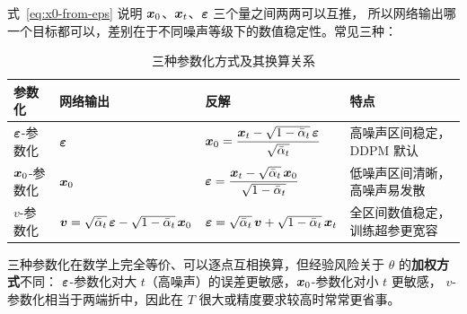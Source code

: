 式~\eqref{eq:x0-from-eps} 说明 $\bm{x}_0$、$\bm{x}_t$、$\bm{\varepsilon}$ 三个量之间两两可以互推，
所以网络输出哪一个目标都可以，差别在于不同噪声等级下的数值稳定性。常见三种：

\begin{table}[htbp]
  \centering
  \caption{三种参数化方式及其换算关系}
  \label{tab:param}
  \small
  \renewcommand{\arraystretch}{1.55}
  \setlength{\tabcolsep}{4pt}
  \begin{tabular}{@{}l l p{4.9cm} p{3.1cm}@{}}
    \toprule
    参数化 & 网络输出 & 反解 & 特点 \\
    \midrule
    $\bm{\varepsilon}$-参数化 & $\bm{\varepsilon}$
      & $\bm{x}_0=\dfrac{\bm{x}_t-\sqrt{1-\bar{\alpha}_t}\,\bm{\varepsilon}}{\sqrt{\bar{\alpha}_t}}$
      & 高噪声区间稳定，DDPM 默认 \\
    $\bm{x}_0$-参数化 & $\bm{x}_0$
      & $\bm{\varepsilon}=\dfrac{\bm{x}_t-\sqrt{\bar{\alpha}_t}\,\bm{x}_0}{\sqrt{1-\bar{\alpha}_t}}$
      & 低噪声区间清晰，高噪声易发散 \\
    $v$-参数化 & $\bm{v}=\sqrt{\bar{\alpha}_t}\,\bm{\varepsilon}-\sqrt{1-\bar{\alpha}_t}\,\bm{x}_0$
      & $\bm{\varepsilon}=\sqrt{\bar{\alpha}_t}\,\bm{v}+\sqrt{1-\bar{\alpha}_t}\,\bm{x}_t$
      & 全区间数值稳定，训练超参更宽容 \\
    \bottomrule
  \end{tabular}
\end{table}

三种参数化在数学上完全等价、可以逐点互相换算，但经验风险关于 $\theta$ 的\textbf{加权方式}不同：
$\bm{\varepsilon}$-参数化对大 $t$（高噪声）的误差更敏感，$\bm{x}_0$-参数化对小 $t$ 更敏感，
$v$-参数化相当于两端折中，因此在 $T$ 很大或精度要求较高时常常更省事\cite{salimans2022progressive}。
